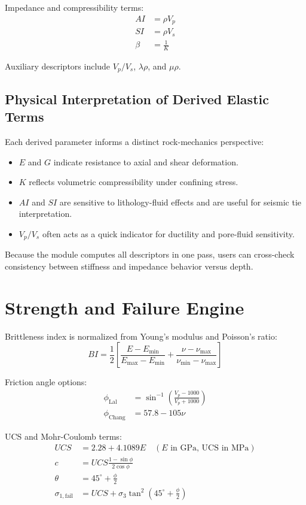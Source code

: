 \documentclass[12pt,a4paper]{report}
\begin{document}
Impedance and compressibility terms:
\begin{align}
AI &= \rho V_p \\
SI &= \rho V_s \\
\beta &= \frac{1}{K}
\end{align}

Auxiliary descriptors include $V_p/V_s$, $\lambda\rho$, and $\mu\rho$.

\subsection{Physical Interpretation of Derived Elastic Terms}
Each derived parameter informs a distinct rock-mechanics perspective:
\begin{itemize}
    \item $E$ and $G$ indicate resistance to axial and shear deformation.
    \item $K$ reflects volumetric compressibility under confining stress.
    \item $AI$ and $SI$ are sensitive to lithology-fluid effects and are useful for seismic tie interpretation.
    \item $V_p/V_s$ often acts as a quick indicator for ductility and pore-fluid sensitivity.
\end{itemize}

Because the module computes all descriptors in one pass, users can cross-check consistency between stiffness and impedance behavior versus depth.

\section{Strength and Failure Engine}
Brittleness index is normalized from Young's modulus and Poisson's ratio:
\begin{equation}
BI = \frac{1}{2}\left[\frac{E-E_{\min}}{E_{\max}-E_{\min}}+\frac{\nu-\nu_{\max}}{\nu_{\min}-\nu_{\max}}\right]
\end{equation}

Friction angle options:
\begin{align}
\phi_{\mathrm{Lal}} &= \sin^{-1}\left(\frac{V_p-1000}{V_p+1000}\right) \\
\phi_{\mathrm{Chang}} &= 57.8 - 105\nu
\end{align}

UCS and Mohr-Coulomb terms:
\begin{align}
UCS &= 2.28 + 4.1089E \quad (E\text{ in GPa, UCS in MPa}) \\
c &= UCS\frac{1-\sin\phi}{2\cos\phi} \\
\theta &= 45^\circ + \frac{\phi}{2} \\
\sigma_{1,\mathrm{fail}} &= UCS + \sigma_3\tan^2\left(45^\circ + \frac{\phi}{2}\right)
\end{align}
\end{document}
